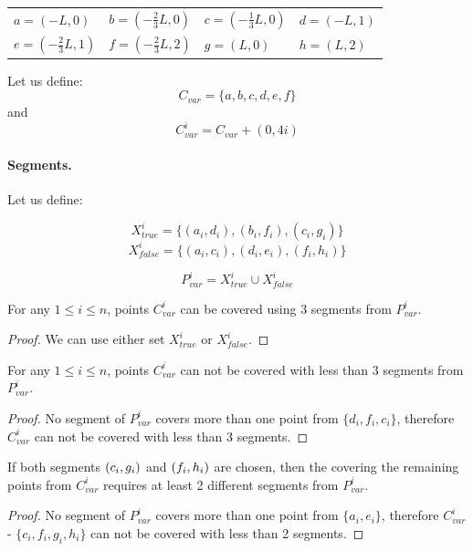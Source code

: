 \begin{center}
\begin{tabular}{ l l l l}
	$a = (-L, 0)$ &
	$b = (-\frac{2}{3}L, 0)$ & 
	$c = (-\frac{1}{3}L, 0)$ & 
	$d = (-L, 1)$ \\  
	$e = (-\frac{2}{3}L, 1)$ & 
	$f = (-\frac{2}{3}L, 2)$ &
	$g = (L, 0)$ &
	$h = (L, 2)$
\end{tabular}
\end{center}

Let us define: $$C_{var} =  \{a, b, c, d, e, f\}$$
and $$C_{var}^i = C_{var} + (0, 4i)$$


\paragraph{Segments.}

Let us define:

$$X_{true}^i =\{ (a_i, d_i), (b_i, f_i), (c_i, g_i)\}$$
$$X_{false}^i = \{(a_i, c_i), (d_i, e_i), (f_i, h_i)\}$$

$$P_{var}^i = X_{true}^i \cup X_{false}^i$$


\begin{lemma}
\label{choose_variables_solution}
For any $1 \le i \le n$, points $C_{var}^i$
can be covered using 3 segments from $P_{var}^i$.
\end{lemma}

\begin{proof}
We can use either set $X_{true}^i$ or $X_{false}^i$.
\end{proof}

\begin{lemma}
\label{choose_variables_no_less}
For any $1 \le i \le n$, points $C_{var}^i$
can not be covered with less than 3 segments from $P_{var}^i$.
\end{lemma}

\begin{proof}
No segment of $P_{var}^i$ covers more than one point from
$\{d_i, f_i, c_i\}$, therefore $C_{var}^i$ can
not be covered with less than 3 segments.
\end{proof}

\begin{lemma}
\label{choose_variables_both}
If both segments $(c_i, g_i)$ and $(f_i, h_i)$ are chosen, then
the covering the remaining points from $C_{var}^i$
requires at least 2 different
segments from $P_{var}^i$.
\end{lemma}
\begin{proof}
No segment of $P_{var}^i$ covers more than one point from
$\{a_i, e_i\}$,
therefore 
$C_{var}^i$ - $\{c_i, f_i, g_i, h_i\}$
can not be covered with less than 2 segments.
\end{proof}


